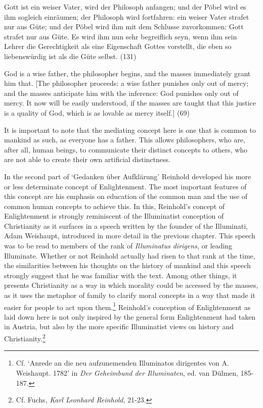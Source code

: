 Gott ist ein weiser Vater, wird der Philosoph anfangen; und der P\"{o}bel wird es ihm sogleich einr\"{a}umen; der Philosoph wird fortfahren: ein weiser Vater strafet nur aus G\"{u}te; und der P\"{o}bel wird ihm mit dem Schlusse zuvorkommen: Gott strafet nur aus G\"{u}te. Es wird ihm nun sehr begreiflich seyn, wenn ihm sein Lehrer die Gerechtigkeit als eine Eigenschaft Gottes vorstellt, die eben so liebensw\"{u}rdig ist als die G\"{u}te selbst. (131) 

God is a wise father, the philosopher begins, and the masses immediately grant him that. [The philosopher proceeds: a wise father punishes only out of mercy; and the masses anticipate him with the inference: God punishes only out of mercy. It now will be easily understood, if the masses are taught that this justice is a quality of God, which is as lovable as mercy itself.] (69)

It is important to note that the mediating concept here is one that is common to mankind as such, as everyone has a father. This allows philosophers, who are, after all, human beings, to communicate their distinct concepts to others, who are not able to create their own artificial distinctness. 

In the second part of `Gedanken \"{u}ber Aufkl\"{a}rung' Reinhold developed his more or less determinate concept of Enlightenment. The most important features of this concept are his emphasis on education of the common man and the use of common human concepts to achieve this. In this, Reinhold's concept of Enlightenment is strongly reminiscent of the Illuminatist conception of Christianity as it surfaces in a speech written by the founder of the Illuminati, Adam Weishaupt, introduced in more detail in the previous chapter. This speech was to be read to members of the rank of \textit{Illuminatus dirigens}, or leading Illuminate. Whether or not Reinhold actually had risen to that rank at the time, the similarities between his thoughts on the history of mankind and this speech strongly suggest that he was familiar with the text. Among other things, it presents Christianity as a way in which morality could be accessed by the masses, as it uses the metaphor of family to clarify moral concepts in a way that made it easier for people to act upon them.\footnote{ Cf. `Anrede an die neu aufzunemenden Illuminatos dirigentes von A. Weishaupt. 1782' in \textit{Der Geheimbund der Illuminaten}, ed. van D\"{u}lmen, 185{-}187. } Reinhold's conception of Enlightenment as laid down here is not only inspired by the general form Enlightenment had taken in Austria, but also by the more specific Illuminatist views on history and Christianity.\footnote{ Cf. Fuchs, \textit{Karl Leonhard Reinhold}, 21{-}23.} 

